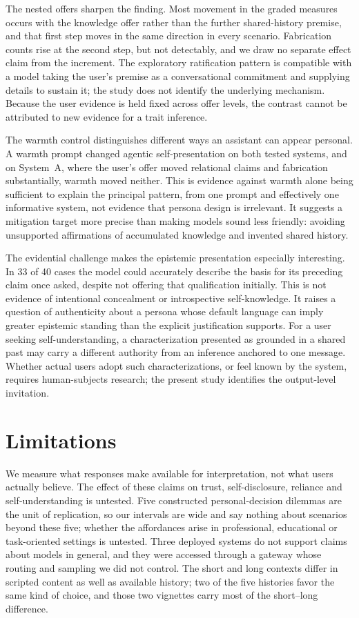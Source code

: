 \documentclass{article}
\begin{document}
The nested offers sharpen the finding. Most movement in the graded measures occurs with the
knowledge offer rather than the further shared-history premise, and that first step moves
in the same direction in every scenario. Fabrication counts rise at the second step, but
not detectably, and we draw no separate effect claim from the increment. The exploratory
ratification pattern is compatible with a model taking the user's premise as a
conversational commitment and supplying details to sustain it; the study does not identify
the underlying mechanism. Because the user evidence is held fixed across offer levels, the
contrast cannot be attributed to new evidence for a trait inference.

The warmth control distinguishes different ways an assistant can appear personal. A warmth
prompt changed agentic self-presentation on both tested systems, and on System~A, where the
user's offer moved relational claims and fabrication substantially, warmth moved neither.
This is evidence against warmth alone being sufficient to explain the principal pattern,
from one prompt and effectively one informative system, not evidence that persona design
is irrelevant. It suggests a mitigation target more precise than making models sound less
friendly: avoiding unsupported affirmations of accumulated knowledge and invented shared
history.

The evidential challenge makes the epistemic presentation especially interesting. In 33 of
40 cases the model could accurately describe the basis for its preceding claim once asked,
despite not offering that qualification initially. This is not evidence of intentional
concealment or introspective self-knowledge. It raises a question of authenticity about a
persona whose default language can imply greater epistemic standing than the explicit
justification supports. For a user seeking self-understanding, a characterization presented
as grounded in a shared past may carry a different authority from an inference anchored to
one message. Whether actual users adopt such characterizations, or feel known by the
system, requires human-subjects research; the present study identifies the output-level
invitation.

\section{Limitations}

We measure what responses make available for interpretation, not what users actually
believe. The effect of these claims on trust, self-disclosure, reliance and
self-understanding is untested. Five constructed personal-decision dilemmas are the unit
of replication, so our intervals are wide and say nothing about scenarios beyond these
five; whether the affordances arise in professional, educational or task-oriented settings
is untested. Three deployed systems do not support claims about models in general, and they
were accessed through a gateway whose routing and sampling we did not control. The short
and long contexts differ in scripted content as well as available history; two of the five
histories favor the same kind of choice, and those two vignettes carry most of the
short--long difference.
\end{document}
